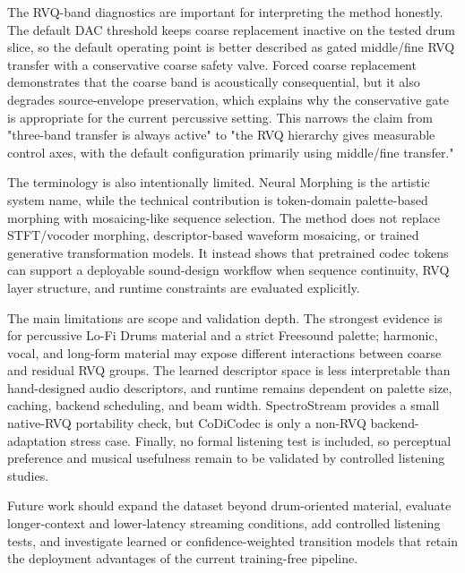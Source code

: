 \documentclass[twoside,a4paper]{article}
\begin{document}
The RVQ-band diagnostics are important for interpreting the method honestly. The default DAC threshold keeps coarse replacement inactive on the tested drum slice, so the default operating point is better described as gated middle/fine RVQ transfer with a conservative coarse safety valve. Forced coarse replacement demonstrates that the coarse band is acoustically consequential, but it also degrades source-envelope preservation, which explains why the conservative gate is appropriate for the current percussive setting. This narrows the claim from "three-band transfer is always active" to "the RVQ hierarchy gives measurable control axes, with the default configuration primarily using middle/fine transfer."

The terminology is also intentionally limited. Neural Morphing is the artistic system name, while the technical contribution is token-domain palette-based morphing with mosaicing-like sequence selection. The method does not replace STFT/vocoder morphing, descriptor-based waveform mosaicing, or trained generative transformation models. It instead shows that pretrained codec tokens can support a deployable sound-design workflow when sequence continuity, RVQ layer structure, and runtime constraints are evaluated explicitly.

The main limitations are scope and validation depth. The strongest evidence is for percussive Lo-Fi Drums material and a strict Freesound palette; harmonic, vocal, and long-form material may expose different interactions between coarse and residual RVQ groups. The learned descriptor space is less interpretable than hand-designed audio descriptors, and runtime remains dependent on palette size, caching, backend scheduling, and beam width. SpectroStream provides a small native-RVQ portability check, but CoDiCodec is only a non-RVQ backend-adaptation stress case. Finally, no formal listening test is included, so perceptual preference and musical usefulness remain to be validated by controlled listening studies.

Future work should expand the dataset beyond drum-oriented material, evaluate longer-context and lower-latency streaming conditions, add controlled listening tests, and investigate learned or confidence-weighted transition models that retain the deployment advantages of the current training-free pipeline.
\end{document}

